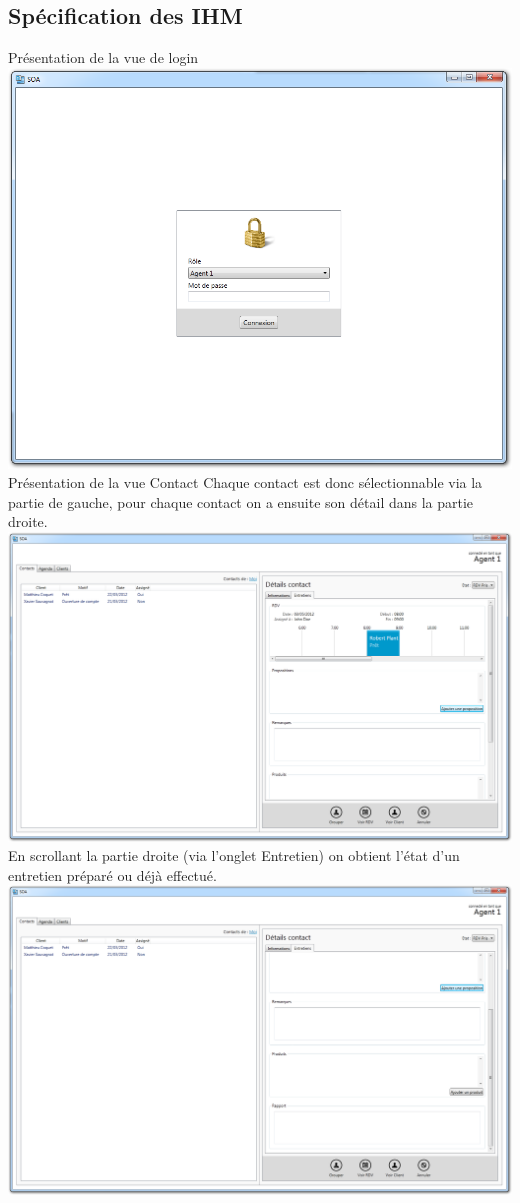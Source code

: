 \subsection{Spécification des IHM}
Présentation de la vue de login
\includegraphics[width=\textwidth]{../../ihm/pngIHM/login.png}
Présentation de la vue Contact
Chaque contact est donc sélectionnable via la partie de gauche, pour chaque contact on a ensuite son détail dans la partie droite.
\includegraphics[width=\textwidth]{../../ihm/pngIHM/ContactEntretiens1.png}
En scrollant la partie droite (via l'onglet Entretien) on obtient l'état d'un entretien préparé ou déjà effectué.
\includegraphics[width=\textwidth]{../../ihm/pngIHM/ContactEntretiens2.png}
